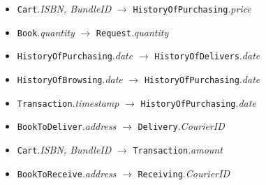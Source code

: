 \documentclass[a4paper,12pt,notitlepage,headsepline,pdftex]{scrartcl}
\begin{document}
  \begin{itemize}
    \item \texttt{Cart}.\textit{ISBN, BundleID} $\rightarrow$
      \texttt{HistoryOfPurchasing}.\textit{price}
    \item \texttt{Book}.\textit{quantity} $\rightarrow$
      \texttt{Request}.\textit{quantity}
    \item \texttt{HistoryOfPurchasing}.\textit{date} $\rightarrow$
      \texttt{HistoryOfDelivers}.\textit{date}
    \item \texttt{HistoryOfBrowsing}.\textit{date} $\rightarrow$
      \texttt{HistoryOfPurchasing}.\textit{date}
    \item \texttt{Transaction}.\textit{timestamp} $\rightarrow$
      \texttt{HistoryOfPurchasing}.\textit{date}
    \item \texttt{BookToDeliver}.\textit{address} $\rightarrow$
      \texttt{Delivery}.\textit{CourierID}
    \item \texttt{Cart}.\textit{ISBN, BundleID} $\rightarrow$
      \texttt{Transaction}.\textit{amount}
    \item \texttt{BookToReceive}.\textit{address} $\rightarrow$
      \texttt{Receiving}.\textit{CourierID}

  \end{itemize}
\end{document}
